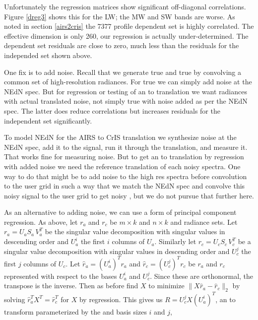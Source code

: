 \documentclass[11pt]{article}
\begin{document}
Unfortunately the regression matrices show significant off-diagonal
correlations.  Figure \ref{dreg3} shows this for the LW; the MW and
SW bands are worse.  As noted in section \ref{airs2cris} the 7377
profile dependent set is highly correlated.  The effective dimension
is only 260, our regression is actually under-determined.  The
dependent set residuals are close to zero, much less than the
residuals for the independed set shown above.

One fix is to add noise.  Recall that we generate true {\airs} 
and true {\cris} by convolving a common set of high-resolution
radiances.  For true {\airs} we can simply add noise at the {\airs}
NEdN spec.  But for regression or testing of an {\airs} to {\cris}
translation we want {\cris} radiances with actual translated {\airs}
noise, not simply true {\cris} with noise added as per the {\cris}
NEdN spec.  The latter does reduce correlations but increases
residuals for the independent set significantly.

To model NEdN for the AIRS to CrIS translation we synthesize noise
at the {\airs} NEdN spec, add it to the signal, run it through the
translation, and measure it.  That works fine for measuring noise.
But to get an {\airs} to {\cris} translation by regression with
added noise we need the reference translation of each noisy {\airs}
spectra.  One way to do that might be to add noise to the high res
spectra before convolution to the {\airs} user grid in such a way
that we match the {\airs} NEdN spec and convolve this noisy signal
to the {\cris} user grid to get noisy {\cris}, but we do not pursue
that further here.

As an alternative to adding noise, we can use a form of principal
component regression.  As above, let $r_a$ and $r_c$ be $m \times k$
and $n \times k$ {\airs} and {\cris} radiance sets.  Let $r_a = U_a
S_a\,V_a^T$ be the singular value decomposition with singular values
in descending order and $U_a^i$ the first $i$ columns of $U_a$.
Similarly let $r_c = U_c S_c\,V_c^T$ be a singular value
decomposition with singular values in descending order and $U_c^j$
the first $j$ columns of $U_c$.  Let $\hat r_a = (U_a^i)^T r_a$ and
$\hat r_c = (U_c^j)^T r_c$ be $r_a$ and $r_c$ represented with
respect to the bases $U_a^i$ and $U_c^j$.  Since these are
orthonormal, the transpose is the inverse.  Then as before find $X$
to minimize $\|X \hat r_a - \hat r_c\|_2$ by solving $\hat r_a^T X^T
= \hat r_c^T$ for $X$ by regression.  This gives us $R = U_c^j X
(U_a^i)^T$, an {\airs} to {\cris} transform parameterized by the
{\airs} and {\cris} basis sizes $i$ and $j$,
\end{document}

